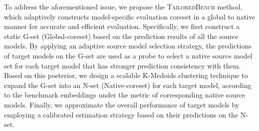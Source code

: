 To address the aforementioned issue, we propose the \textsc{TailoredBench} method, which adaptively constructs model-specific evaluation coreset in a global to native manner for accurate and efficient evaluation.
Specifically, we first construct a static G-set (Global-coreset) based on the prediction results of all the source models.
By applying an adaptive source model selection strategy, the predictions of target models on the G-set are used as a probe to select a native source model set for each target model that has stronger prediction consistency with them. 
Based on this posterior, we design a scalable K-Medoids clustering technique to expand the G-set into an N-set (Native-coreset) for each target model, according to the benchmark embeddings under the metric of corresponding native source models. Finally, we approximate the overall performance of target models by employing a calibrated estimation strategy based on their predictions on the N-set. 

